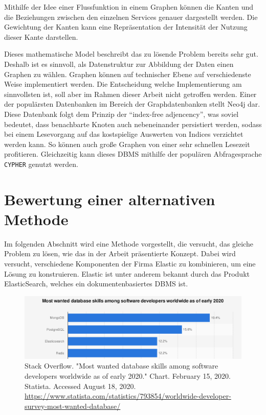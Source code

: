 Mithilfe der Idee einer Flussfunktion in einem Graphen können die Kanten und die Beziehungen zwischen den einzelnen Services genauer dargestellt werden. Die Gewichtung der Kanten kann eine Repräsentation der Intensität der Nutzung dieser Kante darstellen.

Dieses mathematische Model beschreibt das zu lösende Problem bereits sehr gut. Deshalb ist es sinnvoll, als Datenstruktur zur Abbildung der Daten einen Graphen zu wählen. Graphen können auf technischer Ebene auf verschiedenste Weise implementiert werden. Die Entscheidung welche Implementierung am sinnvollsten ist, soll aber im Rahmen dieser Arbeit nicht getroffen werden. Einer der populärsten Datenbanken im Bereich der Graphdatenbanken stellt Neo4j dar. Diese Datenbank folgt dem Prinzip der \enquote{index-free adjencency}, was soviel bedeutet, dass benachbarte Knoten auch nebeneinander persistiert werden, sodass bei einem Lesevorgang auf das kostspielige Auswerten von Indices verzichtet werden kann. So können auch große Graphen von einer sehr schnellen Lesezeit profitieren. Gleichzeitig kann dieses \ac{DBMS} mithilfe der populären Abfragesprache \texttt{CYPHER} genutzt werden.

\section{Bewertung einer alternativen Methode}

Im folgenden Abschnitt wird eine Methode vorgestellt, die versucht, das gleiche Problem zu lösen, wie das in der Arbeit präsentierte Konzept. Dabei wird versucht, verschiedene Komponenten der Firma Elastic zu kombinieren, um eine Lösung zu konstruieren. Elastic ist unter anderem bekannt durch das Produkt ElasticSearch, welches ein dokumentenbasiertes \ac{DBMS} ist.

\begin{figure}[h]
	\centering
	\includegraphics[width=1.0\linewidth]{img/statista_db.png}
	\caption{Stack Overflow. "Most wanted database skills among software developers worldwide as of early 2020." Chart. February 15, 2020. Statista. Accessed August 18, 2020. \url{https://www.statista.com/statistics/793854/worldwide-developer-survey-most-wanted-database/}}
\end{figure}

